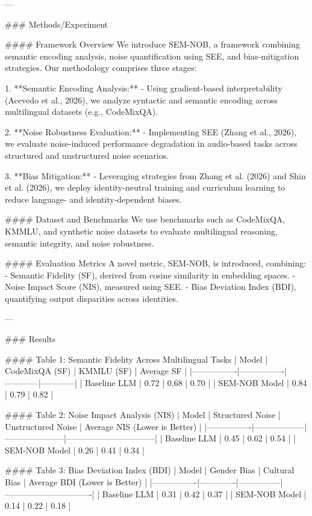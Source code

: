 ---

### Methods/Experiment  

#### Framework Overview  
We introduce SEM-NOB, a framework combining semantic encoding analysis, noise quantification using SEE, and bias-mitigation strategies. Our methodology comprises three stages:  

1. **Semantic Encoding Analysis:**  
   - Using gradient-based interpretability (Acevedo et al., 2026), we analyze syntactic and semantic encoding across multilingual datasets (e.g., CodeMixQA).  

2. **Noise Robustness Evaluation:**  
   - Implementing SEE (Zhang et al., 2026), we evaluate noise-induced performance degradation in audio-based tasks across structured and unstructured noise scenarios.  

3. **Bias Mitigation:**  
   - Leveraging strategies from Zhang et al. (2026) and Shin et al. (2026), we deploy identity-neutral training and curriculum learning to reduce language- and identity-dependent biases.  

#### Dataset and Benchmarks  
We use benchmarks such as CodeMixQA, KMMLU, and synthetic noise datasets to evaluate multilingual reasoning, semantic integrity, and noise robustness.  

#### Evaluation Metrics  
A novel metric, SEM-NOB, is introduced, combining:  
- Semantic Fidelity (SF), derived from cosine similarity in embedding spaces.  
- Noise Impact Score (NIS), measured using SEE.  
- Bias Deviation Index (BDI), quantifying output disparities across identities.  

---

### Results  

#### Table 1: Semantic Fidelity Across Multilingual Tasks  
| Model          | CodeMixQA (SF) | KMMLU (SF) | Average SF |  
|----------------|----------------|------------|------------|  
| Baseline LLM   | 0.72           | 0.68       | 0.70       |  
| SEM-NOB Model  | 0.84           | 0.79       | 0.82       |  

#### Table 2: Noise Impact Analysis (NIS)  
| Model          | Structured Noise | Unstructured Noise | Average NIS (Lower is Better) |  
|----------------|------------------|---------------------|--------------------------------|  
| Baseline LLM   | 0.45             | 0.62                | 0.54                           |  
| SEM-NOB Model  | 0.26             | 0.41                | 0.34                           |  

#### Table 3: Bias Deviation Index (BDI)  
| Model          | Gender Bias | Cultural Bias | Average BDI (Lower is Better) |  
|----------------|-------------|---------------|-------------------------------|  
| Baseline LLM   | 0.31        | 0.42          | 0.37                          |  
| SEM-NOB Model  | 0.14        | 0.22          | 0.18                          |  

